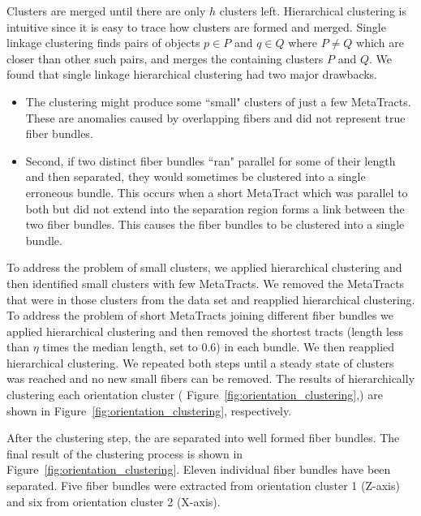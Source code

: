 Clusters are merged until there are only $h$ clusters left.
Hierarchical clustering is intuitive since it is easy to trace how clusters are formed and merged.
Single linkage clustering finds pairs of objects $p \in P$ and $q \in Q$ where $P \neq Q$ which are closer than other such pairs, and merges the containing clusters $P$ and $Q$.
We found that single linkage hierarchical clustering had two major drawbacks.
\begin{itemize}[nolistsep]
	\item The clustering might produce some ``small" clusters of just a few MetaTracts.
	These \mt are anomalies caused by overlapping fibers and did not represent true fiber bundles.
	\item Second, if two distinct fiber bundles ``ran" parallel for some of their length and then separated, they would sometimes be clustered into a single erroneous bundle.
	This occurs when a short MetaTract which was parallel to both but did not extend into the separation region forms a link between the two fiber bundles. This causes the fiber bundles to be clustered into a single bundle.
\end{itemize}

To address the problem of small clusters, we applied hierarchical clustering and then identified small clusters with few MetaTracts.
We removed the MetaTracts that were in those clusters from the data set and reapplied hierarchical clustering.
To address the problem of short MetaTracts joining different fiber bundles we applied hierarchical clustering and then removed the
shortest tracts (length less than $\eta$ times the median length, set to 0.6) in each bundle. We then reapplied hierarchical clustering.
We repeated both steps until a steady state of clusters was reached and no new small fibers can be removed. The results of hierarchically clustering each orientation cluster ( Figure~\ref{fig:orientation_clustering},) are shown in Figure~\ref{fig:orientation_clustering}, respectively.
 
 
After the clustering step, the \mt are separated into well formed fiber bundles. The final result of the clustering process is shown in Figure~\ref{fig:orientation_clustering}. Eleven individual fiber bundles have been separated. Five fiber bundles were extracted from orientation cluster 1 (Z-axis) and six from orientation cluster 2 (X-axis).  
